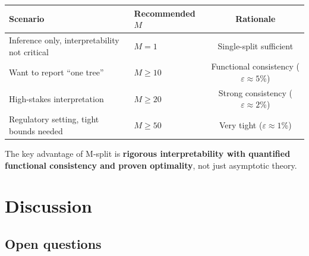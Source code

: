 \documentclass[12pt]{article}
\begin{document}
\begin{remark}
\begin{center}
\begin{tabular}{llc}
\toprule
Scenario & Recommended $M$ & Rationale \\
\midrule
Inference only, interpretability not critical & $M=1$ & Single-split sufficient \\
Want to report ``one tree'' & $M \ge 10$ & Functional consistency ($\varepsilon \approx 5$\%) \\
High-stakes interpretation & $M \ge 20$ & Strong consistency ($\varepsilon \approx 2$\%) \\
Regulatory setting, tight bounds needed & $M \ge 50$ & Very tight ($\varepsilon \approx 1$\%) \\
\bottomrule
\end{tabular}
\end{center}

The key advantage of M-split is \textbf{rigorous interpretability with quantified functional consistency and proven optimality}, not just asymptotic theory.
\end{remark}

\section{Discussion}

\subsection{Open questions}
\end{document}
